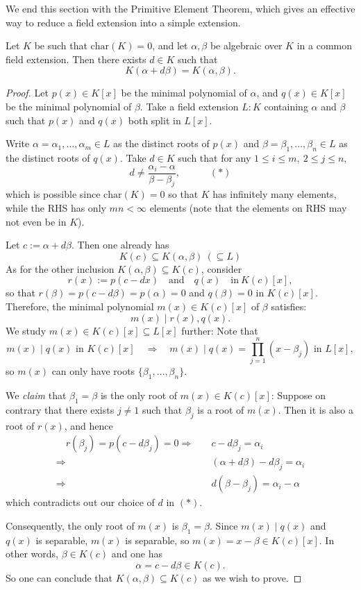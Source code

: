 \medskip
We end this section with the Primitive Element Theorem, which gives an effective way to reduce a field extension into a simple extension.
\begin{theorem} \label{thm-primelt}
    Let $K$ be such that $\mathrm{char}(K) = 0$, and let $\alpha,\beta$ be algebraic over $K$ in a common field extension. Then there exists $d\in K$ such that
    $$K(\alpha+d\beta)=K(\alpha,\beta).$$
\end{theorem}
\begin{proof}Let \( p(x) \in K[x] \) be the minimal polynomial of \( \alpha  \), and \( q(x) \in K[x] \) be the minimal polynomial of \( \beta \).
Take a field extension \(L:K\) containing $\alpha$ and $\beta$ such that \(p(x)\) and \(q(x)\) both split in \(L[x]\). 

Write \( \alpha=\alpha_1, \ldots, \alpha_m \in L \) as the distinct roots of \( p(x) \) and \( \beta=\beta_1, \ldots, \beta_n \in L\) as the distinct roots of \( q(x) \). Take \( d \in K \) such that for any \( 1 \leq i \leq m,\ 2 \leq j \leq n \), 
\[ d \neq \frac{\alpha_i 
 -\alpha}{\beta - \beta_j},  \quad \quad \quad (*)\]
 which is possible since \( \text{char}(K) = 0 \) so that \( K \) has infinitely many elements, while the RHS has only $mn < \infty$ elements (note that the elements on RHS may not even be in \( K \)).

Let \( c := \alpha + d\beta \). Then one already has
\[ K(c) \subseteq K(\alpha, \beta)\ (\subseteq L) \]
As for the other inclusion \( K(\alpha, \beta) \subseteq K(c) \), consider 
\[ r(x):=p(c - dx) \quad \text{and} \quad q(x)  \quad \text{in}\ K(c)[x], \]
so that $r(\beta) = p(c - d\beta) = p(\alpha) = 0$ and $q(\beta) = 0$ in $K(c)[x]$. Therefore, the minimal polynomial \(m(x)\in K(c)[x]\) of $\beta$ satisfies: 
\[m(x) \mid r(x), q(x).\]
We study \(m(x) \in K(c)[x] \subseteq L[x]\) further: Note that 
\[m(x) \mid q(x) \text{ in } K(c)[x] \quad \Rightarrow \quad m(x) \mid q(x) =\prod_{j=1}^n (x- \beta_j) \text{ in } L[x],\]
so \(m(x)\) can only have roots $\{\beta_1, \ldots, \beta_n\}$. 

We {\it claim} that $\beta_1 = \beta$ is the only root of $m(x) \in K(c)[x]$: Suppose on contrary that there exists \(j \neq 1\) such that $\beta_j$ is a root of $m(x)$. Then it is also a root of $r(x)$, and hence
\begin{align*}
    \quad r(\beta_j) = p(c - d\beta_j) = 0 \Rightarrow & \quad c - d\beta_j = \alpha_i \\
\Rightarrow & \quad (\alpha + d\beta) - d\beta_j = \alpha_i \\
\Rightarrow & \quad d(\beta - \beta_j) = \alpha_i - \alpha
\end{align*}
which contradicts out our choice of $d$ in $(*)$. 

Consequently, the only root of $m(x)$ is $\beta_1=\beta$. Since $m(x)\mid q(x)$ and $q(x)$ is separable, $m(x)$ is separable, so \(m(x)=x-\beta\in K(c)[x]\). 
In other words, 
\(\beta \in K(c)\) and one has
\[ \alpha = c - d\beta \in K(c).\]
So one can conclude that \(K(\alpha, \beta) \subseteq K(c)\) as we wish to prove.
\end{proof}
